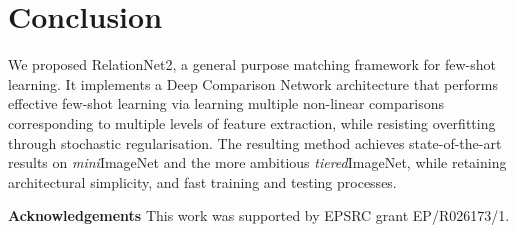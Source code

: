 \documentclass[conference]{IEEEtran}
\def\modelname{Deep Comparison Network\xspace}
\def\tierIN{\textit{tiered}ImageNet}
\def\miniIN{\textit{mini}ImageNet}
\newcommand{\keypoint}[1]{\vspace{0.05cm}\noindent\textbf{#1}\quad}
\begin{document}
\section{Conclusion}
We proposed RelationNet2, a general purpose matching framework for few-shot learning. It implements a \modelname{} architecture that performs effective few-shot learning via learning multiple non-linear comparisons  corresponding to multiple levels of feature extraction, while resisting overfitting through stochastic regularisation. The resulting method achieves state-of-the-art results on \miniIN{} and the more ambitious \tierIN{}, while retaining architectural simplicity, and fast training and testing processes.

\keypoint{Acknowledgements} This work was supported by EPSRC grant EP/R026173/1. 

{\small


}





\clearpage
\end{document}
